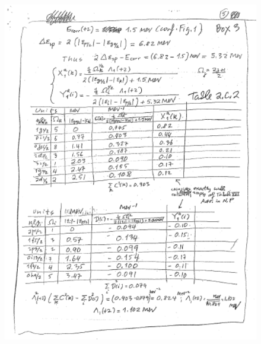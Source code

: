 \documentclass[a4paper,11pt]{book}
\numberwithin{equation}{section}
\numberwithin{figure}{section}
\numberwithin{table}{section}
\begin{document}
\begin{figure}
\centerline{\includegraphics*[width=\textwidth,angle=0]{figs/box3_5.pdf}}
\caption{}\label{box3}
\end{figure}
\end{document}
